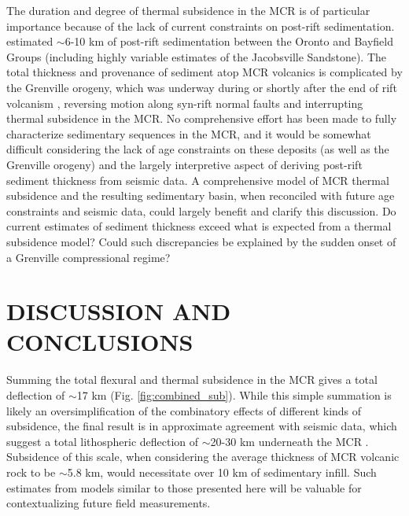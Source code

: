 \documentclass[12pt,letterpaper]{article}
\begin{document}
The duration and degree of thermal subsidence in the MCR is of particular importance because of the lack of current constraints on post-rift sedimentation. \cite{Ojakangas2001a} estimated $\sim$6-10 km of post-rift sedimentation between the Oronto and Bayfield Groups (including highly variable estimates of the Jacobsville Sandstone). The total thickness and provenance of sediment atop MCR volcanics is complicated by the Grenville orogeny, which was underway during or shortly after the end of rift volcanism \citep{Halls2015a}, reversing motion along syn-rift normal faults and interrupting thermal subsidence in the MCR. No comprehensive effort has been made to fully characterize sedimentary sequences in the MCR, and it would be somewhat difficult considering the lack of age constraints on these deposits (as well as the Grenville orogeny) and the largely interpretive aspect of deriving post-rift sediment thickness from seismic data. A comprehensive model of MCR thermal subsidence and the resulting sedimentary basin, when reconciled with future age constraints and seismic data, could largely benefit and clarify this discussion. Do current estimates of sediment thickness exceed what is expected from a thermal subsidence model? Could such discrepancies be explained by the sudden onset of a Grenville compressional regime?

\section{DISCUSSION AND CONCLUSIONS}

Summing the total flexural and thermal subsidence in the MCR gives a total deflection of $\sim$17 km (Fig. \ref{fig:combined_sub}). While this simple summation is likely an oversimplification of the combinatory effects of different kinds of subsidence, the final result is in approximate agreement with seismic data, which suggest a total lithospheric deflection of $\sim$20-30 km underneath the MCR \citep{Ojakangas2001a}. Subsidence of this scale, when considering the average thickness of MCR volcanic rock to be $\sim$5.8 km, would necessitate over 10 km of sedimentary infill. Such estimates from models similar to those presented here will be valuable for contextualizing future field measurements.\par
\end{document}
